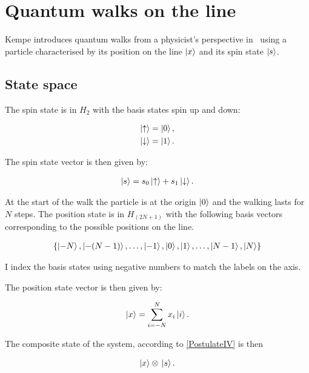 \section{Quantum walks on the line}

Kempe introduces quantum walks from a physicist's perspective in~\cite{KempeIntroduction} using a particle characterised by its position on the line $\ket{x}$ and its spin state $\ket{s}$.

\subsection{State space}


The spin state is in $H_2$ with the basis states spin up and down:

\begin{align*}
\ket{\uparrow} = \ket{0}, \\
\ket{\downarrow} = \ket{1}.
\end{align*}

The spin state vector is then given by:

\begin{align*}
\ket{s} = s_0 \ket{\uparrow} + s_1 \ket{\downarrow}.
\end{align*}


At the start of the walk the particle is at the origin $\ket{0}$ and the walking lasts for $N$ steps. The position state is in $H_{(2N+1)}$ with the following basis vectors corresponding to the possible positions on the line.

\begin{align*}
\{
\ket{-N},\ket{-(N-1)},\dots,
\ket{-1},\ket{0},\ket{1},\dots,
\ket{N-1},\ket{N}
\}
\end{align*}

I index the basis states using negative numbers to match the labels on the axis.

The position state vector is then given by:

\begin{align*}
    \ket{x} = \sum\limits_{i=-N}^{N}x_i\ket{i}.
\end{align*}


The composite state of the system, according to \hyperref[PostulateIV]{[PostulateIV]} is then

\begin{align*}
    \ket{x}\otimes{}\ket{s}.
\end{align*}

